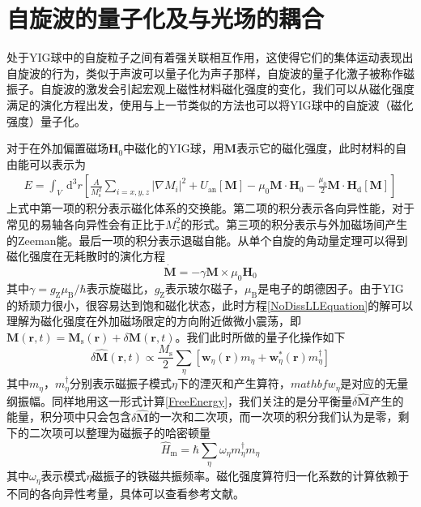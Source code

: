 \section{自旋波的量子化及与光场的耦合}
处于YIG球中的自旋粒子之间有着强关联相互作用，这使得它们的集体运动表现出自旋波的行为，类似于声波可以量子化为声子那样，自旋波的量子化激子被称作磁振子。自旋波的激发会引起宏观上磁性材料磁化强度的变化，我们可以从磁化强度满足的演化方程出发，使用与上一节类似的方法也可以将YIG球中的自旋波（磁化强度）量子化。

对于在外加偏置磁场$\mathbf{H}_0$中磁化的YIG球，用$\mathbf{M}$表示它的磁化强度，此时材料的自由能可以表示为
\begin{equation}
\begin{aligned}
E=\int_{V} \mathrm{~d}^{3} r \left[\frac{A}{M_{\mathrm{s}}^{2}} \sum_{i=x, y, z}\left|\nabla M_{i}\right|^{2}+U_{\mathrm{an}}[\mathbf{M}]-\mu_{0} \mathbf{M} \cdot \mathbf{H}_{0}-\frac{\mu_{0}}{2} \mathbf{M} \cdot \mathbf{H}_{\mathrm{d}}[\mathbf{M}]\right]
\label{FreeEnergy}
\end{aligned}
\end{equation}
上式中第一项的积分表示磁化体系的交换能。第二项的积分表示各向异性能，对于常见的易轴各向异性会有正比于$M_z^2$的形式。第三项的积分表示与外加磁场间产生的Zeeman能。最后一项的积分表示退磁自能。从单个自旋的角动量定理可以得到磁化强度在无耗散时的演化方程
\begin{equation}
\dot{\mathbf{M}}=-\gamma \mathbf{M} \times \mu_{0} \mathbf{H}_{0}
\label{NoDissLLEquation}
\end{equation}
其中$\gamma=g_{\mathrm{Z}} \mu_{\mathrm{B}} / \hbar$表示旋磁比，$g_{\mathrm{Z}}$表示玻尔磁子，$\mu_{\mathrm{B}}$是电子的朗德因子。由于YIG的矫顽力很小，很容易达到饱和磁化状态，此时方程\eqref{NoDissLLEquation}的解可以理解为磁化强度在外加磁场限定的方向附近做微小震荡，即$\mathbf{M}(\mathbf{r},t)=\mathbf{M}_{\mathrm{s}}(\mathbf{r})+\delta \mathbf{M}(\mathbf{r}, t)$。我们此时所做的量子化操作如下
\begin{equation}
\delta \hat{\mathbf{M}}(\mathbf{r}, t) \propto \frac{M_{\mathrm{s}}}{2} \sum_{\eta}\left[\mathbf{w}_{\eta}(\mathbf{r}) {m}_{\eta}+\mathbf{w}_{\eta}^{*}(\mathbf{r}) {m}_{\eta}^{\dagger}\right]
\label{MOperator}
\end{equation}
其中${m}_{\eta}$，${m}_{\eta}^{\dagger}$分别表示磁振子模式$\eta$下的湮灭和产生算符，$mathbf{w}_{\eta}$是对应的无量纲振幅。同样地用这一形式计算\eqref{FreeEnergy}，我们关注的是分平衡量$\delta \hat{\mathbf{M}}$产生的能量，积分项中只会包含$\delta \hat{\mathbf{M}}$的一次和二次项，而一次项的积分我们认为是零，剩下的二次项可以整理为磁振子的哈密顿量
\begin{equation}
\hat{H}_{\mathrm{m}}=\hbar \sum_{\eta} \omega_{\eta} {m}_{\eta}^{\dagger} {m}_{\eta}
\end{equation}
其中$\omega_{\eta}$表示模式${\eta}$磁振子的铁磁共振频率。磁化强度算符归一化系数的计算依赖于不同的各向异性考量，具体可以查看参考文献。

